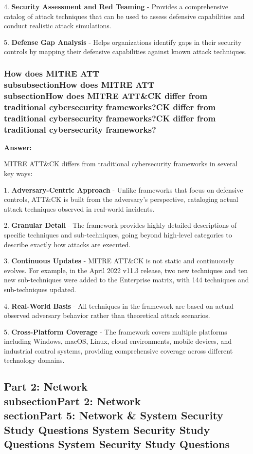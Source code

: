 \documentclass[12pt,a4paper]{article}
\begin{document}
4. \textbf{Security Assessment and Red Teaming} - Provides a comprehensive catalog of attack techniques that can be used to assess defensive capabilities and conduct realistic attack simulations.

5. \textbf{Defense Gap Analysis} - Helps organizations identify gaps in their security controls by mapping their defensive capabilities against known attack techniques. 

\subsubsection{How does MITRE ATT\\subsubsection{How does MITRE ATT\\subsection{How does MITRE ATT\&CK differ from traditional cybersecurity frameworks?}CK differ from traditional cybersecurity frameworks?}CK differ from traditional cybersecurity frameworks?}

\textbf{Answer:}

MITRE ATT\&CK differs from traditional cybersecurity frameworks in several key ways:

1. \textbf{Adversary-Centric Approach} - Unlike frameworks that focus on defensive controls, ATT\&CK is built from the adversary's perspective, cataloging actual attack techniques observed in real-world incidents.

2. \textbf{Granular Detail} - The framework provides highly detailed descriptions of specific techniques and sub-techniques, going beyond high-level categories to describe exactly how attacks are executed.

3. \textbf{Continuous Updates} - MITRE ATT\&CK is not static and continuously evolves. For example, in the April 2022 v11.3 release, two new techniques and ten new sub-techniques were added to the Enterprise matrix, with 144 techniques and sub-techniques updated. 

4. \textbf{Real-World Basis} - All techniques in the framework are based on actual observed adversary behavior rather than theoretical attack scenarios.

5. \textbf{Cross-Platform Coverage} - The framework covers multiple platforms including Windows, macOS, Linux, cloud environments, mobile devices, and industrial control systems, providing comprehensive coverage across different technology domains.

\subsection{Part 2: Network \\subsection{Part 2: Network \\section{Part 5: Network \& System Security Study Questions} System Security Study Questions} System Security Study Questions}
\end{document}
